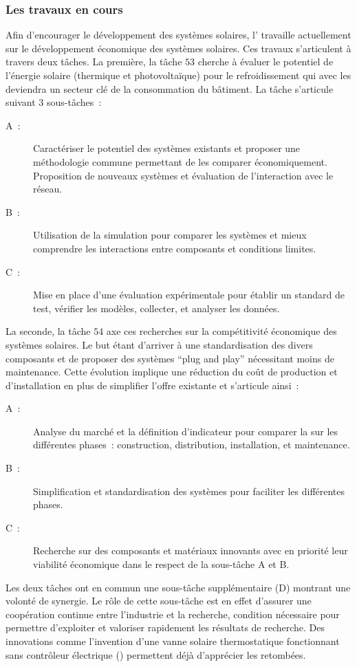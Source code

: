\subsubsection{Les travaux en cours} %
\label{ssub:les_travaux_en_cours}
Afin d’encourager le développement des systèmes solaires, l’ travaille
actuellement sur le développement économique des systèmes solaires. Ces travaux s’articulent
à travers deux tâches. La première, la tâche $53$ cherche à évaluer le potentiel
de l’énergie solaire (thermique et photovoltaïque) pour le refroidissement qui
avec les  deviendra un secteur clé de la consommation du bâtiment.
La tâche s’articule suivant $3$ sous-tâches~:
\begin{description}
    \item[A~:] Caractériser le potentiel des systèmes existants et proposer une méthodologie
                commune permettant de les comparer économiquement. Proposition de nouveaux
                systèmes et évaluation de l’interaction avec le réseau.
    \item[B~:] Utilisation de la simulation pour comparer les systèmes et mieux
                comprendre les interactions entre composants et conditions limites.
    \item[C~:] Mise en place d’une évaluation expérimentale pour établir un standard
                de test, vérifier les modèles, collecter, et analyser les données.
\end{description}
La seconde, la tâche $54$ axe ces recherches sur la compétitivité économique des
systèmes solaires. Le but étant d’arriver à une standardisation des
divers composants et de proposer des systèmes \enquote{plug and play} nécessitant
moins de maintenance. Cette évolution implique une réduction du coût de production
et d’installation en plus de simplifier l’offre existante et s’articule ainsi~:
\begin{description}
    \item [A~:] Analyse du marché et la définition d’indicateur pour comparer la
                sur les différentes phases~: construction, distribution, installation, et maintenance.
    \item [B~:] Simplification et standardisation des systèmes pour faciliter les différentes
                phases.
    \item [C~:] Recherche sur des composants et matériaux innovants avec en priorité
                leur viabilité économique dans le respect de la sous-tâche A et B.
\end{description}
Les deux tâches ont en commun une sous-tâche supplémentaire (D) montrant une volonté
de synergie. Le rôle de cette sous-tâche est en effet d’assurer une coopération
continue entre l’industrie et la recherche, condition nécessaire
pour permettre d’exploiter et valoriser rapidement les résultats de recherche.
Des innovations comme l’invention d’une vanne solaire thermostatique fonctionnant
sans contrôleur électrique ()
permettent déjà d’apprécier les retombées.


